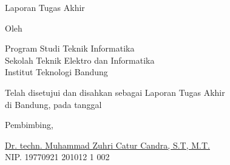 \clearpage
\pagestyle{empty}

\begin{center}
	\smallskip

	\Large \bfseries \MakeUppercase{\thetitle}
	\vfill

	\Large Laporan Tugas Akhir
	\vfill

	\large Oleh

	\Large \theauthor

	\large Program Studi Teknik Informatika \\

	\normalsize \normalfont
	Sekolah Teknik Elektro dan Informatika \\
	Institut Teknologi Bandung \\

	\vfill
	\normalsize \normalfont

	Telah disetujui dan disahkan sebagai Laporan Tugas Akhir \\
	di Bandung, pada tanggal \tanggalpengesahan

	\vspace{0.5cm}
	Pembimbing,

	\vfill
	\underline{Dr. techn. Muhammad Zuhri Catur Candra, S.T, M.T.
	} \\
	NIP. 19770921 201012 1 002

\end{center}
\clearpage
